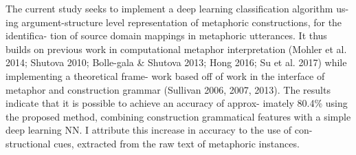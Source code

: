 The current study seeks to implement a deep learning classification algorithm us- ing argument-structure level representation of metaphoric constructions, for the identifica- tion of source domain mappings in metaphoric utterances. It thus builds on previous work in computational metaphor interpretation (Mohler et al. 2014; Shutova 2010; Bolle-gala \& Shutova 2013; Hong 2016; Su et al. 2017) while implementing a theoretical frame- work based off of work in the interface of metaphor and construction grammar (Sullivan 2006, 2007, 2013). The results indicate that it is possible to achieve an accuracy of approx- imately 80.4\% using the proposed method, combining construction grammatical features with a simple deep learning NN. I attribute this increase in accuracy to the use of con- structional cues, extracted from the raw text of metaphoric instances.
